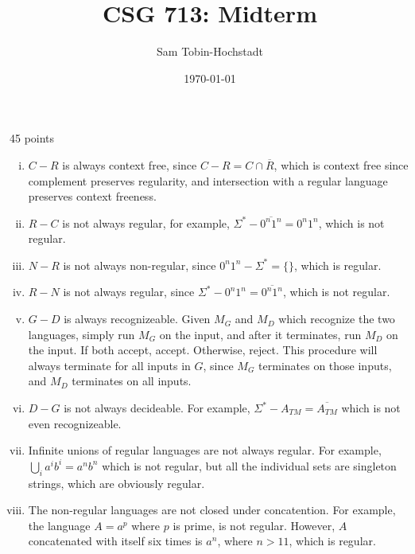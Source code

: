 \documentclass[12pt]
{article}
\title{CSG 713: Midterm}
\author{Sam Tobin-Hochstadt}
\date{\today}
\newenvironment{proof}[1][Proof]{\begin{trivlist}
\item[\hskip \labelsep {\bfseries #1}]}{\end{trivlist}}
\begin{document}
\maketitle

\begin{proof}[Problem 1] 45 points
\begin{enumerate}[i.]
\item $C - R$ is always context free, since $C-R = C \cap
  \overline{R}$, which is context free since complement preserves
  regularity, and intersection with a regular language preserves
  context freeness.
\item $R - C$ is not always regular, for example, $\Sigma^* -
  \overline{0^n1^n} = 0^n1^n$, which is not regular.
\item $N - R$ is not always non-regular, since $0^n1^n - \Sigma^*  =
  \{\}$, which is regular. 
\item $R - N$ is not always regular, since $\Sigma^* - 0^n1^n =
  \overline{0^n1^n}$, which is not regular.
\item $G - D$ is always recognizeable.  Given $M_G$ and $M_D$ which
  recognize the two languages, simply run $M_G$ on the input, and
  after it terminates, run $M_D$ on the input.  If both accept,
  accept.  Otherwise, reject.  This procedure will always terminate
  for all inputs in $G$, since $M_G$ terminates on those inputs, and
  $M_D$ terminates on all inputs.  
\item $D - G$ is not always decideable.  For example, $\Sigma^* -
  A_{TM} = \overline{A_{TM}}$ which is not even recognizeable.
\item Infinite unions of regular languages are not always regular.
  For example, $\displaystyle \bigcup_i a^ib^i = a^nb^n$ which is not
  regular, but all the individual sets are singleton strings, which
  are obviously regular.
\item The non-regular languages are not closed under concatention.
  For example, the language $A = a^p$ where $p$ is prime, is not
  regular.  However, $A$ concatenated with itself six times is $a^n$, where
  $n>11$, which is regular.
\end{enumerate}
\end{proof}
\end{document}
